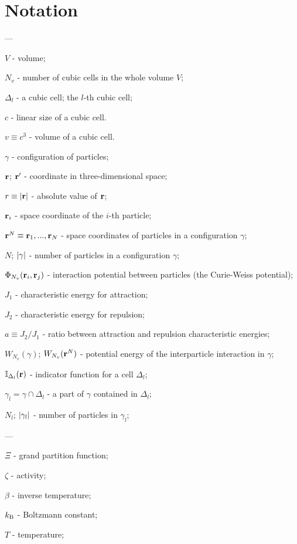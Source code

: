 \section{Notation}

---

$V$ - volume;

$N_v$ - number of cubic cells in the whole volume $V$;

$\Delta_{l}$ - a cubic cell; the $l$-th cubic cell;

$c$ - linear size of a cubic cell.

$v \equiv c^3$ - volume of a cubic cell.

$\gamma$ - configuration of particles;

$\vb r$; $\vb{r}'$ - coordinate in three-dimensional space;

$r \equiv \abs{\vb r}$ - absolute value of $\vb r$;

$\vb{r}_i$ - space coordinate of the $i$-th particle;

$\vb{r}^N \equiv \vb{r}_1, ..., \vb{r}_N$ - space coordinates of particles in a configuration $\gamma$;

$N$; $\abs{\gamma}$ - number of particles in a configuration $\gamma$;

$\Phi_{N_v}(\vb{r}_i, \vb{r}_j)$ - interaction potential between particles (the Curie-Weiss potential);

$J_1$ - characteristic energy for attraction;

$J_2$ - characteristic energy for repulsion;

$a \equiv J_2/J_1$ - ratio between attraction and repulsion characteristic energies;

$W_{N_v}(\gamma)$; $W_{N_v}(\vb{r}^N)$ - potential energy of the interparticle interaction in $\gamma$;

$\mathbb{I}_{\Delta_l} (\vb{r})$ - indicator function for a cell $\Delta_{l}$;

$\gamma_l = \gamma \cap \Delta_l$ - a part of $\gamma$ contained in $\Delta_l$;

$N_l$; $\abs{\gamma_l}$ - number of particles in $\gamma_l$;

---

$\Xi$ - grand partition function;

$\zeta$ - activity;

$\beta$ - inverse temperature;

$k_{\rm B}$ - Boltzmann constant;

$T$ - temperature;

